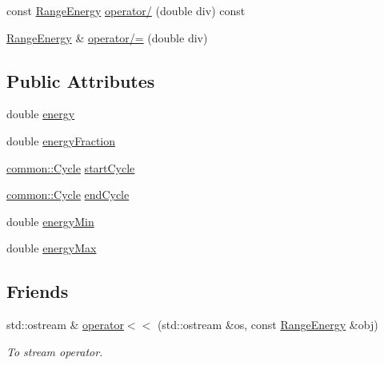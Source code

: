 \begin{DoxyCompactItemize}
const \hyperlink{structcryomesh_1_1manipulators_1_1ClusterAnalysisData_1_1RangeEnergy}{\-Range\-Energy} \hyperlink{structcryomesh_1_1manipulators_1_1ClusterAnalysisData_1_1RangeEnergy_a86f0ca22060ff3039d8df9457edae402}{operator/} (double div) const 
\item 
\hyperlink{structcryomesh_1_1manipulators_1_1ClusterAnalysisData_1_1RangeEnergy}{\-Range\-Energy} \& \hyperlink{structcryomesh_1_1manipulators_1_1ClusterAnalysisData_1_1RangeEnergy_a2bc35c2465673beb91fc67d0e5c595c1}{operator/=} (double div)
\end{DoxyCompactItemize}
\subsection*{\-Public \-Attributes}
\begin{DoxyCompactItemize}
\item 
double \hyperlink{structcryomesh_1_1manipulators_1_1ClusterAnalysisData_1_1RangeEnergy_a5ec0dd8061e8109c679fb03c46175f41}{energy}
\item 
double \hyperlink{structcryomesh_1_1manipulators_1_1ClusterAnalysisData_1_1RangeEnergy_a5b00be235f5ec97fc564a87b7a53e15f}{energy\-Fraction}
\item 
\hyperlink{classcryomesh_1_1common_1_1Cycle}{common\-::\-Cycle} \hyperlink{structcryomesh_1_1manipulators_1_1ClusterAnalysisData_1_1RangeEnergy_a4160dfffe32413f76e5effce2c95ae20}{start\-Cycle}
\item 
\hyperlink{classcryomesh_1_1common_1_1Cycle}{common\-::\-Cycle} \hyperlink{structcryomesh_1_1manipulators_1_1ClusterAnalysisData_1_1RangeEnergy_afc1f6d068e8301e327981a578b83f981}{end\-Cycle}
\item 
double \hyperlink{structcryomesh_1_1manipulators_1_1ClusterAnalysisData_1_1RangeEnergy_aca92fb70884ff9717e530d91130d5e8d}{energy\-Min}
\item 
double \hyperlink{structcryomesh_1_1manipulators_1_1ClusterAnalysisData_1_1RangeEnergy_a51770c52465ceb02f9d452a46bedff77}{energy\-Max}
\end{DoxyCompactItemize}
\subsection*{\-Friends}
\begin{DoxyCompactItemize}
\item 
std\-::ostream \& \hyperlink{structcryomesh_1_1manipulators_1_1ClusterAnalysisData_1_1RangeEnergy_a99c9c1ea00dd9e77cfaa8ac83f560854}{operator$<$$<$} (std\-::ostream \&os, const \hyperlink{structcryomesh_1_1manipulators_1_1ClusterAnalysisData_1_1RangeEnergy}{\-Range\-Energy} \&obj)
\begin{DoxyCompactList}\small\item\em \-To stream operator. \end{DoxyCompactList}\end{DoxyCompactItemize}


